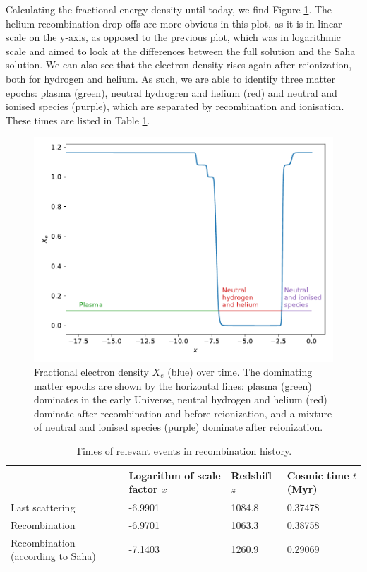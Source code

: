 \documentclass{aa}
\begin{document}
Calculating the fractional energy density until today, we find Figure \ref{fig:Xe-reion}. The helium recombination drop-offs are more obvious in this plot, as it is in linear scale on the y-axis, as opposed to the previous plot, which was in logarithmic scale and aimed to look at the differences between the full solution and the Saha solution. We can also see that the electron density rises again after reionization, both for hydrogen and helium. As such, we are able to identify three matter epochs: plasma (green), neutral hydrogren and helium (red) and neutral and ionised species (purple), which are separated by recombination and ionisation. These times are listed in Table \ref{table:times-rec}.

\begin{figure}[ht]
    \centering
    \includegraphics[width=\hsize]{report/figures/Xe-reion.pdf}
    \caption{Fractional electron density $X_e$ (blue) over time. The dominating matter epochs are shown by the horizontal lines: plasma (green) dominates in the early Universe, neutral hydrogen and helium (red) dominate after recombination and before reionization, and a mixture of neutral and ionised species (purple) dominate after reionization.}
    \label{fig:Xe-reion}
\end{figure}

\begin{table}[ht]
\caption{Times of relevant events in recombination history.}             
\label{table:times-rec}      
\centering          
\begin{tabular}{l l l l}     %
\hline\hline       
& Logarithm of scale factor $x$      & Redshift $z$     & Cosmic time $t$ (Myr)\\ 
\hline                    
Last scattering   & -6.9901  & 1084.8  & 0.37478 \\
Recombination & -6.9701 & 1063.3 & 0.38758                 \\
Recombination (according to Saha) & -7.1403 & 1260.9 & 0.29069\\
\hline                  
\end{tabular}
\end{table}
\end{document}
